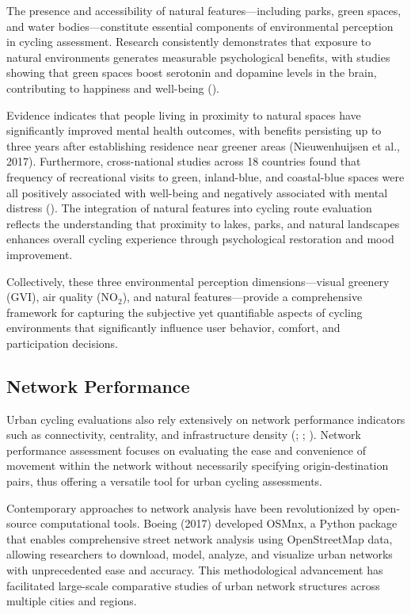 \documentclass[
  12pt,
  oneside]{book}
\begin{document}
The presence and accessibility of natural features---including parks, green spaces, and water bodies---constitute essential components of environmental perception in cycling assessment. Research consistently demonstrates that exposure to natural environments generates measurable psychological benefits, with studies showing that green spaces boost serotonin and dopamine levels in the brain, contributing to happiness and well-being (\textcite{lee_health_2011}).

Evidence indicates that people living in proximity to natural spaces have significantly improved mental health outcomes, with benefits persisting up to three years after establishing residence near greener areas (Nieuwenhuijsen et al., 2017). Furthermore, cross-national studies across 18 countries found that frequency of recreational visits to green, inland-blue, and coastal-blue spaces were all positively associated with well-being and negatively associated with mental distress (\textcite{hooyberg_general_2020}). The integration of natural features into cycling route evaluation reflects the understanding that proximity to lakes, parks, and natural landscapes enhances overall cycling experience through psychological restoration and mood improvement.

Collectively, these three environmental perception dimensions---visual greenery (GVI), air quality (NO\(_2\)), and natural features---provide a comprehensive framework for capturing the subjective yet quantifiable aspects of cycling environments that significantly influence user behavior, comfort, and participation decisions.

\subsection{Network Performance}\label{network-performance}

Urban cycling evaluations also rely extensively on network performance indicators such as connectivity, centrality, and infrastructure density (\textcite{lowry_assessment_2012}; \textcite{geurs_multi-modal_2016}; \textcite{buehler_bikeway_2016}). Network performance assessment focuses on evaluating the ease and convenience of movement within the network without necessarily specifying origin-destination pairs, thus offering a versatile tool for urban cycling assessments.

Contemporary approaches to network analysis have been revolutionized by open-source computational tools. Boeing (2017) developed OSMnx, a Python package that enables comprehensive street network analysis using OpenStreetMap data, allowing researchers to download, model, analyze, and visualize urban networks with unprecedented ease and accuracy. This methodological advancement has facilitated large-scale comparative studies of urban network structures across multiple cities and regions.
\end{document}
